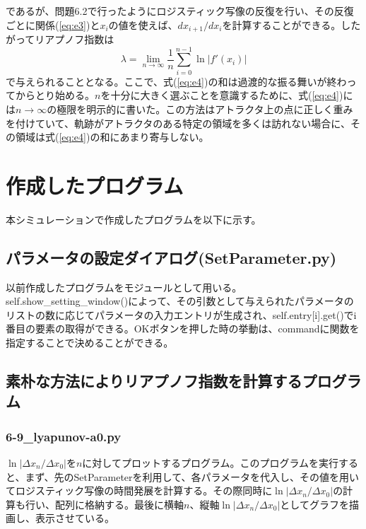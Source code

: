 \documentclass{jsarticle}
\begin{document}
        であるが、問題6.2で行ったようにロジスティック写像の反復を行い、その反復ごとに関係(\ref{eq:e3})と$x_{i}$の値を使えば、$dx_{i+1}/dx_{i}$を計算することができる。したがってリアプノフ指数は
        \begin{equation}
            \lambda = \lim_{n \rightarrow \infty} \frac{1}{n} \sum_{i=0}^{n-1} \ln | f'(x_{i}) |
            \label{eq:e4}
        \end{equation}
        で与えられることとなる。ここで、式(\ref{eq:e4})の和は過渡的な振る舞いが終わってからとり始める。$n$を十分に大きく選ぶことを意識するために、式(\ref{eq:e4})には$n \rightarrow \infty$の極限を明示的に書いた。この方法はアトラクタ上の点に正しく重みを付けていて、軌跡がアトラクタのある特定の領域を多くは訪れない場合に、その領域は式(\ref{eq:e4})の和にあまり寄与しない。
        

    \section{作成したプログラム}
        本シミュレーションで作成したプログラムを以下に示す。
    
    
        \subsection{パラメータの設定ダイアログ(SetParameter.py)}
            以前作成したプログラムをモジュールとして用いる。self.show\_setting\_window()によって、その引数として与えられたパラメータのリストの数に応じてパラメータの入力エントリが生成され、self.entry[i].get()でi番目の要素の取得ができる。OKボタンを押した時の挙動は、commandに関数を指定することで決めることができる。
            
        \subsection{素朴な方法によりリアプノフ指数を計算するプログラム}
            
            \subsubsection{6-9\_lyapunov-a0.py}
            $\ln |\Delta x_{n} / \Delta x_{0}|$を$n$に対してプロットするプログラム。このプログラムを実行すると、まず、先のSetParameterを利用して、各パラメータを代入し、その値を用いてロジスティック写像の時間発展を計算する。その際同時に$\ln |\Delta x_{n} / \Delta x_{0}|$の計算も行い、配列に格納する。最後に横軸$n$、縦軸$\ln |\Delta x_{n} / \Delta x_{0}|$としてグラフを描画し、表示させている。
            
\end{document}
